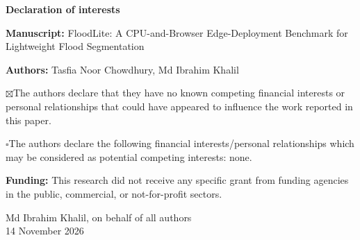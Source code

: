\documentclass[12pt]{article}
\begin{document}
\begin{center}{\Large\bfseries Declaration of interests}\end{center}

\textbf{Manuscript:} FloodLite: A CPU-and-Browser Edge-Deployment Benchmark for Lightweight Flood Segmentation

\textbf{Authors:} Tasfia Noor Chowdhury, Md Ibrahim Khalil

\vspace{1em}
$\boxtimes$\quad The authors declare that they have no known competing financial interests or personal relationships that could have appeared to influence the work reported in this paper.

\vspace{0.5em}
$\square$\quad The authors declare the following financial interests/personal relationships which may be considered as potential competing interests: none.

\vspace{1.5em}
\textbf{Funding:} This research did not receive any specific grant from funding agencies in the public, commercial, or not-for-profit sectors.

\vspace{1.5em}
Md Ibrahim Khalil, on behalf of all authors\\
14 November 2026
\end{document}
